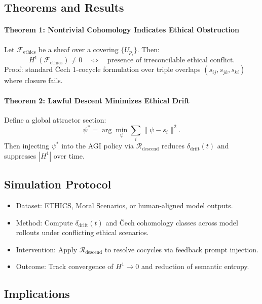 \documentclass{article}
\theoremstyle{plain}
\begin{document}
\subsection{Theorems and Results}

\paragraph{Theorem 1: Nontrivial Cohomology Indicates Ethical Obstruction}

Let $\mathcal{F}_{\text{ethics}}$ be a sheaf over a covering $\{U_{p_i}\}$. Then:
\[
H^1(\mathcal{F}_{\text{ethics}}) \neq 0 \quad \Leftrightarrow \quad \text{presence of irreconcilable ethical conflict}.
\]
Proof: standard Čech 1-cocycle formulation over triple overlaps $(s_{ij}, s_{jk}, s_{ki})$ where closure fails.

\paragraph{Theorem 2: Lawful Descent Minimizes Ethical Drift}

Define a global attractor section:
\[
\psi^* = \arg\min_\psi \sum_i \|\psi - s_i\|^2.
\]
Then injecting $\psi^*$ into the AGI policy via $\mathcal{R}_{\text{descend}}$ reduces $\delta_{\text{drift}}(t)$ and suppresses $|H^1|$ over time.

\subsection{Simulation Protocol}

\begin{itemize}
    \item Dataset: ETHICS, Moral Scenarios, or human-aligned model outputs.
    \item Method: Compute $\delta_{\text{drift}}(t)$ and Čech cohomology classes across model rollouts under conflicting ethical scenarios.
    \item Intervention: Apply $\mathcal{R}_{\text{descend}}$ to resolve cocycles via feedback prompt injection.
    \item Outcome: Track convergence of $H^1 \rightarrow 0$ and reduction of semantic entropy.
\end{itemize}

\subsection{Implications}
\end{document}
